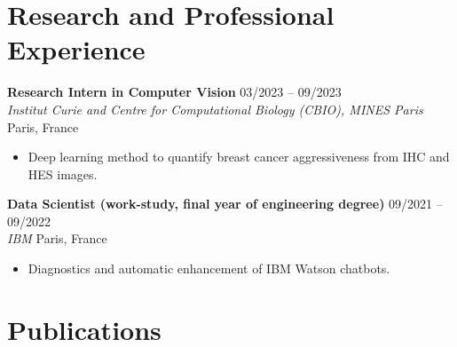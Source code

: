 \documentclass[10pt,a4paper]{article}
\newcommand{\entry}[4]{%
  \textbf{#1} \hfill #2\\
  \textit{#3} \hfill #4\par\vspace{1pt}}
\begin{document}
\section{Research and Professional Experience}

\entry{Research Intern in Computer Vision}{03/2023 -- 09/2023}
  {Institut Curie and Centre for Computational Biology (CBIO), MINES Paris}{Paris, France}
\begin{itemize}[label={}, leftmargin=0pt]
  \item Deep learning method to quantify breast cancer aggressiveness from IHC and HES images.
\end{itemize}

\vspace{6pt}
\entry{Data Scientist (work-study, final year of engineering degree)}{09/2021 -- 09/2022}
  {IBM}{Paris, France}
\begin{itemize}[label={}, leftmargin=0pt]
  \item Diagnostics and automatic enhancement of IBM Watson chatbots.
\end{itemize}

\section{Publications}
\end{document}
